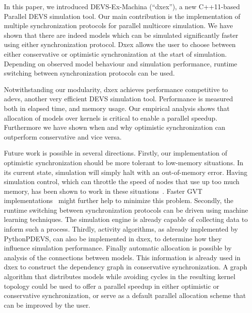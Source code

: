 In this paper, we introduced DEVS-Ex-Machina (``dxex''), a new C++11-based \textsf{Parallel DEVS} simulation tool.
Our main contribution is the implementation of multiple synchronization protocols for parallel multicore simulation.
We have shown that there are indeed models which can be simulated significantly faster using either synchronization protocol.
Dxex allows the user to choose between either conservative or optimistic synchronization at the start of simulation.
Depending on observed model behaviour and simulation performance, runtime switching between synchronization protocols can be used.

Notwithstanding our modularity, dxex achieves performance competitive to adevs, another very efficient \textsf{DEVS} simulation tool.
Performance is measured both in elapsed time, and memory usage.
Our empirical analysis shows that allocation of models over kernels is critical to enable a parallel speedup. Furthermore we have shown when and why optimistic synchronization can outperform conservative and vice versa.

Future work is possible in several directions.
Firstly, our implementation of optimistic synchronization should be more tolerant to low-memory situations.
In its current state, simulation will simply halt with an out-of-memory error.
Having simulation control, which can throttle the speed of nodes that use up too much memory, has been shown to work in these situations~\cite{FujimotoBook}.
Faster GVT implementations~\cite{Fujimoto:1997:CGV:268403.268404,Bauer:2005:SND:1069810.1070159} might further help to minimize this problem.
Secondly, the runtime switching between synchronization protocols can be driven using machine learning techniques. The simulation engine is already capable of collecting data to inform such a process.
Thirdly, activity algorithms, as already implemented by PythonPDEVS, can also be implemented in dxex, to determine how they influence simulation performance.
Finally automatic allocation is possible by analysis of the connections between models. This information is already used in dxex to construct the dependency graph in conservative synchronization. A graph algorithm that distributes models while avoiding cycles in the resulting kernel topology could be used to offer a parallel speedup in either optimistic or conservative synchronization, or serve as a default parallel allocation scheme that can be improved by the user.
